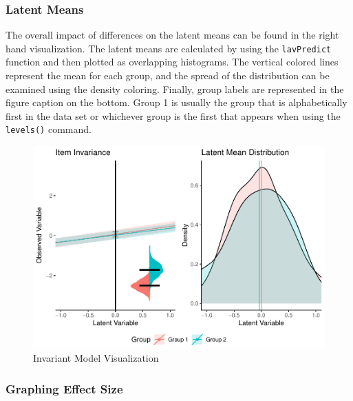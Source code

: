 \documentclass[
  man]{apa7}
\begin{document}
\hypertarget{latent-means}{%
\subsubsection{Latent Means}\label{latent-means}}

The overall impact of differences on the latent means can be found in the right hand visualization. The latent means are calculated by using the \texttt{lavPredict} function and then plotted as overlapping histograms. The vertical colored lines represent the mean for each group, and the spread of the distribution can be examined using the density coloring. Finally, group labels are represented in the figure caption on the bottom. Group 1 is usually the group that is alphabetically first in the data set or whichever group is the first that appears when using the \texttt{levels()} command.

\begin{figure}
\centering
\includegraphics{manuscript_files/figure-latex/invariant-pic-1.pdf}
\caption{\label{fig:invariant-pic}Invariant Model Visualization}
\end{figure}

\hypertarget{graphing-effect-size}{%
\subsubsection{Graphing Effect Size}\label{graphing-effect-size}}
\end{document}
